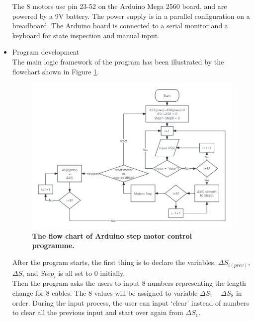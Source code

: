 \begin{itemize}
\begin{figure}[H]
    \end{figure}
    The 8 motors use pin 23-52 on the Arduino Mega 2560 board, and are powered by a 9V battery. The power supply 
    is in a parallel configuration on a breadboard. The Arduino board is connected to a serial monitor and a 
    keyboard for state inspection and manual input.
    \item Program development \\
    The main logic framework of the program has been illustrated by the flowchart shown in Figure \ref{fig:motor_flowchart}.
    \begin{figure}[H] %
        \centering %
        \captionsetup{labelsep=colon}
        \includegraphics[width=1.0\textwidth]{Image/Design/flowchart_arduino_motor.png} 
        \caption[The flow chart of Arduino step motor control programme]
        {\centering \textbf{The flow chart of Arduino step motor control programme.}}
        \label{fig:motor_flowchart}
    \end{figure}
    After the program starts, the first thing is to declare the variables. $\Delta S_{i(prev)}$, $\Delta S_i$ and 
    $Step_i$ is all set to 0 initially. \\ Then the program asks the users to input 8 numbers representing the 
    length change for 8 cables. The 8 values will be assigned to variable $\Delta S_1$ ~ $\Delta S_8$ in order. 
    During the input process, the user can input `clear' instead of numbers to clear all the previous input and 
    start over again from $\Delta S_1$. \\

\end{itemize}
